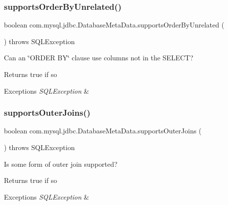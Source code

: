 \subsubsection{\texorpdfstring{supports\+Order\+By\+Unrelated()}{supportsOrderByUnrelated()}}
{\footnotesize\ttfamily boolean com.\+mysql.\+jdbc.\+Database\+Meta\+Data.\+supports\+Order\+By\+Unrelated (\begin{DoxyParamCaption}{ }\end{DoxyParamCaption}) throws S\+Q\+L\+Exception}

Can an \char`\"{}\+O\+R\+D\+E\+R B\+Y\char`\"{} clause use columns not in the S\+E\+L\+E\+CT?

\begin{DoxyReturn}{Returns}
true if so 
\end{DoxyReturn}

\begin{DoxyExceptions}{Exceptions}
{\em S\+Q\+L\+Exception} & \\
\hline
\end{DoxyExceptions}
\mbox{\label{classcom_1_1mysql_1_1jdbc_1_1_database_meta_data_a06a7b70011cbdf146cde2d6bad2b3267}} 
\subsubsection{\texorpdfstring{supports\+Outer\+Joins()}{supportsOuterJoins()}}
{\footnotesize\ttfamily boolean com.\+mysql.\+jdbc.\+Database\+Meta\+Data.\+supports\+Outer\+Joins (\begin{DoxyParamCaption}{ }\end{DoxyParamCaption}) throws S\+Q\+L\+Exception}

Is some form of outer join supported?

\begin{DoxyReturn}{Returns}
true if so 
\end{DoxyReturn}

\begin{DoxyExceptions}{Exceptions}
{\em S\+Q\+L\+Exception} & \\
\hline
\end{DoxyExceptions}
\mbox{\label{classcom_1_1mysql_1_1jdbc_1_1_database_meta_data_af730aaff017aeefb5a7d019b6e370f6c}} 
